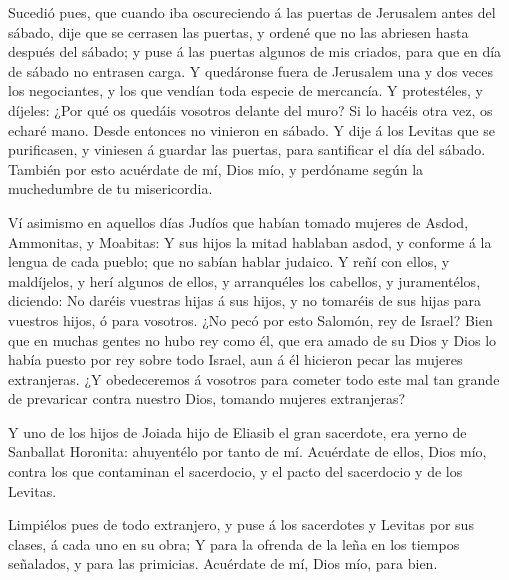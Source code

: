  Sucedió pues, que cuando iba oscureciendo á las puertas de
Jerusalem antes del sábado, dije que se cerrasen las puertas, y ordené
que no las abriesen hasta después del sábado; y puse á las puertas
algunos de mis criados, para que en día de sábado no entrasen carga.
 Y quedáronse fuera de Jerusalem una y dos veces los
negociantes, y los que vendían toda especie de mercancía. 
Y protestéles, y díjeles: ¿Por qué os quedáis vosotros delante del muro?
Si lo hacéis otra vez, os echaré mano. Desde entonces no vinieron en
sábado.  Y dije á los Levitas que se purificasen, y
viniesen á guardar las puertas, para santificar el día del sábado.
También por esto acuérdate de mí, Dios mío, y perdóname según la
muchedumbre de tu misericordia.

 Ví asimismo en aquellos días Judíos que habían tomado
mujeres de Asdod, Ammonitas, y Moabitas:  Y sus hijos la
mitad hablaban asdod, y conforme á la lengua de cada pueblo; que no
sabían hablar judaico.  Y reñí con ellos, y maldíjelos, y
herí algunos de ellos, y arranquéles los cabellos, y juramentélos,
diciendo: No daréis vuestras hijas á sus hijos, y no tomaréis de sus
hijas para vuestros hijos, ó para vosotros.  ¿No pecó por
esto Salomón, rey de Israel? Bien que en muchas gentes no hubo rey como
él, que era amado de su Dios y Dios lo había puesto por rey sobre todo
Israel, aun á él hicieron pecar las mujeres extranjeras. 
¿Y obedeceremos á vosotros para cometer todo este mal tan grande de
prevaricar contra nuestro Dios, tomando mujeres extranjeras?

 Y uno de los hijos de Joiada hijo de Eliasib el gran
sacerdote, era yerno de Sanballat Horonita: ahuyentélo por tanto de mí.
 Acuérdate de ellos, Dios mío, contra los que contaminan el
sacerdocio, y el pacto del sacerdocio y de los Levitas.

 Limpiélos pues de todo extranjero, y puse á los sacerdotes
y Levitas por sus clases, á cada uno en su obra;  Y para la
ofrenda de la leña en los tiempos señalados, y para las primicias.
Acuérdate de mí, Dios mío, para bien.
